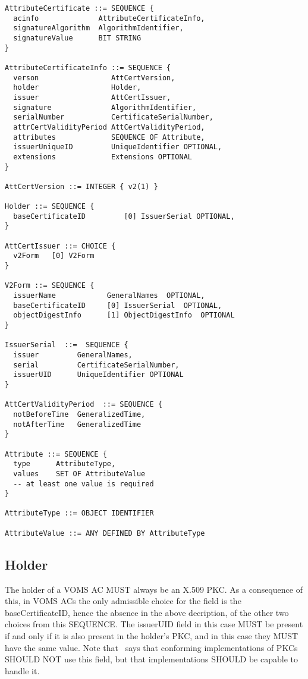 \documentclass[a4]{article}
\begin{document}
\begin{verbatim}
AttributeCertificate ::= SEQUENCE {
  acinfo              AttributeCertificateInfo,
  signatureAlgorithm  AlgorithmIdentifier,
  signatureValue      BIT STRING
}

AttributeCertificateInfo ::= SEQUENCE {
  verson                 AttCertVersion,
  holder                 Holder,
  issuer                 AttCertIssuer,
  signature              AlgorithmIdentifier,
  serialNumber           CertificateSerialNumber,
  attrCertValidityPeriod AttCertValidityPeriod,
  attributes             SEQUENCE OF Attribute,
  issuerUniqueID         UniqueIdentifier OPTIONAL,
  extensions             Extensions OPTIONAL
}

AttCertVersion ::= INTEGER { v2(1) }

Holder ::= SEQUENCE {
  baseCertificateID         [0] IssuerSerial OPTIONAL,
}

AttCertIssuer ::= CHOICE {
  v2Form   [0] V2Form
}

V2Form ::= SEQUENCE {
  issuerName            GeneralNames  OPTIONAL,
  baseCertificateID     [0] IssuerSerial  OPTIONAL,
  objectDigestInfo      [1] ObjectDigestInfo  OPTIONAL
}

IssuerSerial  ::=  SEQUENCE {
  issuer         GeneralNames,
  serial         CertificateSerialNumber,
  issuerUID      UniqueIdentifier OPTIONAL
}

AttCertValidityPeriod  ::= SEQUENCE {
  notBeforeTime  GeneralizedTime,
  notAfterTime   GeneralizedTime
}

Attribute ::= SEQUENCE {
  type      AttributeType,
  values    SET OF AttributeValue
  -- at least one value is required
}

AttributeType ::= OBJECT IDENTIFIER

AttributeValue ::= ANY DEFINED BY AttributeType
\end{verbatim}

\subsection{Holder}
The holder of a VOMS AC MUST always be an X.509 PKC.  As a consequence
of this, in VOMS ACs the only admissible choice for the field is the
baseCertificateID, hence the absence in the above decription, of the
other two choices from this SEQUENCE. The issuerUID field in this case
MUST be present if and only if it is also present in the holder's PKC,
and in this case they MUST have the same value. Note that
\cite{rfc3280}\ says that conforming implementations of PKCs SHOULD
NOT use this field, but that implementations SHOULD be capable to
handle it.
\end{document}
